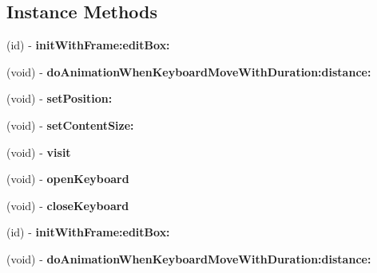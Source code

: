 \subsection*{Instance Methods}
\begin{DoxyCompactItemize}
\item 
\mbox{\label{interfaceEditBoxServiceImplMac_abe853131811321711576192e21a3a64e}} 
(id) -\/ {\bfseries init\+With\+Frame\+:edit\+Box\+:}
\item 
\mbox{\label{interfaceEditBoxServiceImplMac_ae5191e20d74b8c4dd14df7af339204dd}} 
(void) -\/ {\bfseries do\+Animation\+When\+Keyboard\+Move\+With\+Duration\+:distance\+:}
\item 
\mbox{\label{interfaceEditBoxServiceImplMac_afded7909b2622918b3ffde232cd371e6}} 
(void) -\/ {\bfseries set\+Position\+:}
\item 
\mbox{\label{interfaceEditBoxServiceImplMac_a1c922649895750c10548c7c2c5ee7793}} 
(void) -\/ {\bfseries set\+Content\+Size\+:}
\item 
\mbox{\label{interfaceEditBoxServiceImplMac_ab472e528fca02f533241549f5e11cfab}} 
(void) -\/ {\bfseries visit}
\item 
\mbox{\label{interfaceEditBoxServiceImplMac_a2e1269cca434abf80d3ce0320ad681d6}} 
(void) -\/ {\bfseries open\+Keyboard}
\item 
\mbox{\label{interfaceEditBoxServiceImplMac_ae82fd127252017d182080d12c093e208}} 
(void) -\/ {\bfseries close\+Keyboard}
\item 
\mbox{\label{interfaceEditBoxServiceImplMac_abe853131811321711576192e21a3a64e}} 
(id) -\/ {\bfseries init\+With\+Frame\+:edit\+Box\+:}
\item 
\mbox{\label{interfaceEditBoxServiceImplMac_ae5191e20d74b8c4dd14df7af339204dd}} 
(void) -\/ {\bfseries do\+Animation\+When\+Keyboard\+Move\+With\+Duration\+:distance\+:}
\item 

\end{DoxyCompactItemize}
